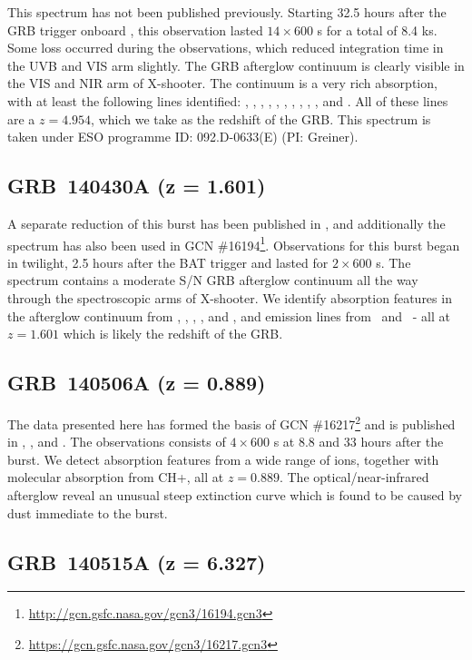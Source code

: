 \documentclass{aa}    %
\begin{document}
This spectrum has not been published previously. Starting 32.5 hours after the
GRB trigger onboard \swift, this observation lasted $14\times600$ s for a total
of 8.4 ks. Some loss occurred during the observations, which reduced integration
time in the UVB and VIS arm slightly. The GRB afterglow continuum is clearly
visible in the VIS and NIR arm of X-shooter. The continuum is a very rich
absorption, with at least the following lines identified: \lyg, \lyb, \lya,
\SIii, \SIiv, \civ, \alii, \aliii, \feii, \mgii, and \mgi. All of these lines
are a $z = 4.954$, which we take as the redshift of the GRB. This spectrum is
taken under ESO programme ID: 092.D-0633(E) (PI: Greiner).

\subsection{GRB~140430A (z = 1.601)}	

A separate reduction of this burst has been published in \citet{Kruhler2015},
and additionally the spectrum has also been used in GCN
\#16194\footnote{\url{http://gcn.gsfc.nasa.gov/gcn3/16194.gcn3}}. Observations
for this burst began in twilight, 2.5 hours after the BAT trigger and lasted for
$2\times600$ s. The spectrum contains a moderate S/N GRB afterglow continuum all
the way through the spectroscopic arms of X-shooter. We identify absorption
features in the afterglow continuum from \SIii, \civ, \alii, \feii, and \mgii,
and emission lines from \oii~and \oiii~- all at $z = 1.601$ which is likely the
redshift of the GRB.

\subsection{GRB~140506A  (z = 0.889)} 

The data presented here has formed the basis of GCN
\#16217\footnote{\url{https://gcn.gsfc.nasa.gov/gcn3/16217.gcn3}} and is
published in \citet{Fynbo2014}, \citet{Kruhler2015}, and \citet{Heintz2017a}.
The observations consists of $4\times 600$ s at 8.8 and 33 hours after the
burst. We detect absorption features from a wide range of ions, together with
molecular absorption from CH+, all at $z=0.889$. The optical/near-infrared
afterglow reveal an unusual steep extinction curve which is found to be caused
by dust immediate to the burst.

\subsection{GRB~140515A (z = 6.327)}	
\end{document}
